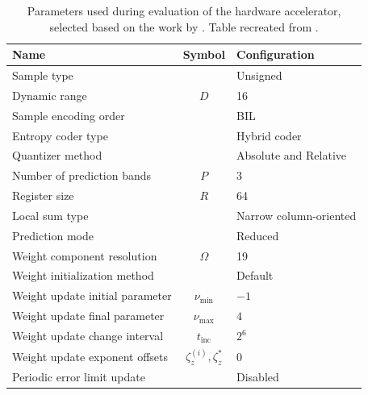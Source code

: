 \begin{table}[p!]
	\centering
	\caption{Parameters used during evaluation of the hardware accelerator, selected based on the work by \citeauthor{blanesPerformanceImpactParameter2019} \cite{blanesPerformanceImpactParameter2019}. Table recreated from \cite{vorhaugHyperspectralImageCompression2024}.}
	\label{tab:parameters}
	\begin{tabular}{lcl}
		\toprule
		\textbf{Name}                    & \textbf{Symbol}              & \textbf{Configuration} \\
		\midrule
		Sample type                      &                              & Unsigned               \\
		Dynamic range                    & $D$                          & 16                     \\
		Sample encoding order            &                              & BIL                    \\
		Entropy coder type               &                              & Hybrid coder           \\
		Quantizer method                 &                              & Absolute and Relative  \\
		Number of prediction bands       & $P$                          & 3                      \\
		Register size                    & $R$                          & 64                     \\
		Local sum type                   &                              & Narrow column-oriented \\
		Prediction mode                  &                              & Reduced                \\
		Weight component resolution      & $\Omega$                     & 19                     \\
		Weight initialization method     &                              & Default                \\
		Weight update initial parameter  & $\nu_{\min}$                 & $-1$                   \\
		Weight update final parameter    & $\nu_{\max}$                 & $4$                    \\
		Weight update change interval    & $t_{\text{inc}}$             & $2^6$                  \\
		Weight update exponent offsets   & $\zeta_z^{(i)}, \zeta_z^{*}$ & $0$                    \\
		Periodic error limit update      &                              & Disabled               \\

\end{tabular}
\end{table}
